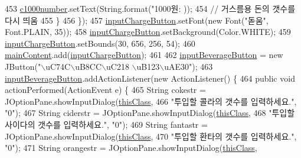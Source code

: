 \begin{DoxyCode}
{{{{{{{{{{{{{{{{{{{{{{{{{{{{{{{{{{{{{{{{{{{{{{{{{{{{{{{{{{453                 \hyperlink{class_vending_machine_1_1_machine_u_i_a019654970035375965815c2c6bf4fc71}{c1000number}.setText(String.format(\textcolor{stringliteral}{"1000원: %
      ));
454                 \textcolor{comment}{// 거스름용 돈의 갯수를 다시 띄움}
455             \}
456         \});
457         \hyperlink{class_vending_machine_1_1_machine_u_i_af087897ffa9ab50127ab87daf7fb072f}{inputChargeButton}.setFont(\textcolor{keyword}{new} Font(\textcolor{stringliteral}{"돋움"}, Font.PLAIN, 35));
458         \hyperlink{class_vending_machine_1_1_machine_u_i_af087897ffa9ab50127ab87daf7fb072f}{inputChargeButton}.setBackground(Color.WHITE);
459         \hyperlink{class_vending_machine_1_1_machine_u_i_af087897ffa9ab50127ab87daf7fb072f}{inputChargeButton}.setBounds(30, 656, 256, 54);
460         \hyperlink{class_vending_machine_1_1_machine_u_i_a2a9d8b6482b348ca6efb5ff6973e3a3b}{mainContent}.add(\hyperlink{class_vending_machine_1_1_machine_u_i_af087897ffa9ab50127ab87daf7fb072f}{inputChargeButton});
461         
462         \hyperlink{class_vending_machine_1_1_machine_u_i_a1f437e079f7a931ee649ac03540d5f49}{inputBeverageButton} = \textcolor{keyword}{new} JButton(\textcolor{stringliteral}{"\(\backslash\)uC74C\(\backslash\)uB8CC\(\backslash\)uC218 \(\backslash\)uB123\(\backslash\)uAE30"});
463         \hyperlink{class_vending_machine_1_1_machine_u_i_a1f437e079f7a931ee649ac03540d5f49}{inputBeverageButton}.addActionListener(\textcolor{keyword}{new} ActionListener() \{
464             \textcolor{keyword}{public} \textcolor{keywordtype}{void} actionPerformed(ActionEvent e) \{
465                 String cokestr = JOptionPane.showInputDialog(\hyperlink{class_vending_machine_1_1_machine_u_i_a0d705e137d12427a9af68595eb2be582}{thisClass},
466                         \textcolor{stringliteral}{"투입할 콜라의 갯수를 입력하세요."}, \textcolor{stringliteral}{"0"});
467                 String ciderstr = JOptionPane.showInputDialog(\hyperlink{class_vending_machine_1_1_machine_u_i_a0d705e137d12427a9af68595eb2be582}{thisClass},
468                         \textcolor{stringliteral}{"투입할 사이다의 갯수를 입력하세요."}, \textcolor{stringliteral}{"0"});
469                 String fantastr = JOptionPane.showInputDialog(\hyperlink{class_vending_machine_1_1_machine_u_i_a0d705e137d12427a9af68595eb2be582}{thisClass},
470                         \textcolor{stringliteral}{"투입할 환타의 갯수를 입력하세요."}, \textcolor{stringliteral}{"0"});
471                 String orangestr = JOptionPane.showInputDialog(\hyperlink{class_vending_machine_1_1_machine_u_i_a0d705e137d12427a9af68595eb2be582}{thisClass},
}}}}}}}}}}}}}}}}}}}}}}}}}}}}}}}}}}}}}}}}}}}}}}}}}}}}}}}}}}}
\end{DoxyCode}
